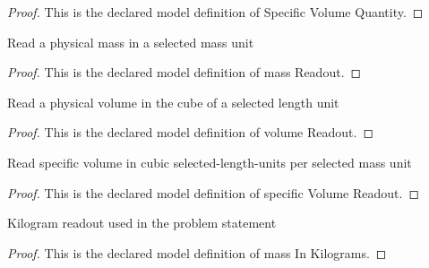 \begin{proof}
  This is the declared model definition of Specific Volume Quantity.
\end{proof}
\begin{definition}
  \label{def:physics:phyx-mini-0450:phyxminiproblems-problemphyxmini0450-massreadout}
  Read a physical mass in a selected mass unit
\end{definition}
\begin{proof}
  This is the declared model definition of mass Readout.
\end{proof}
\begin{definition}
  \label{def:physics:phyx-mini-0450:phyxminiproblems-problemphyxmini0450-volumereadout}
  Read a physical volume in the cube of a selected length unit
\end{definition}
\begin{proof}
  This is the declared model definition of volume Readout.
\end{proof}
\begin{definition}
  \label{def:physics:phyx-mini-0450:phyxminiproblems-problemphyxmini0450-specificvolumereadout}
  Read specific volume in cubic selected-length-units per selected mass unit
\end{definition}
\begin{proof}
  This is the declared model definition of specific Volume Readout.
\end{proof}
\begin{definition}
  \label{def:physics:phyx-mini-0450:phyxminiproblems-problemphyxmini0450-massinkilograms}
  Kilogram readout used in the problem statement
\end{definition}
\begin{proof}
  This is the declared model definition of mass In Kilograms.
\end{proof}
